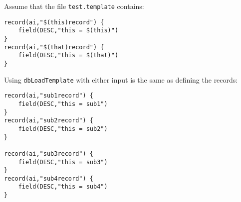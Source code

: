 Assume that the file \verb|test.template| contains:

\begin{lstlisting}[language=dbd]
record(ai,"$(this)record") {
    field(DESC,"this = $(this)")
}
record(ai,"$(that)record") {
    field(DESC,"this = $(that)")
}
\end{lstlisting}

Using \verb|dbLoadTemplate| with either input is the same as defining the records:

\begin{lstlisting}[language=dbd]
record(ai,"sub1record") {
    field(DESC,"this = sub1")
}
record(ai,"sub2record") {
    field(DESC,"this = sub2")
}

record(ai,"sub3record") {
    field(DESC,"this = sub3")
}
record(ai,"sub4record") {
    field(DESC,"this = sub4")
}
\end{lstlisting}
